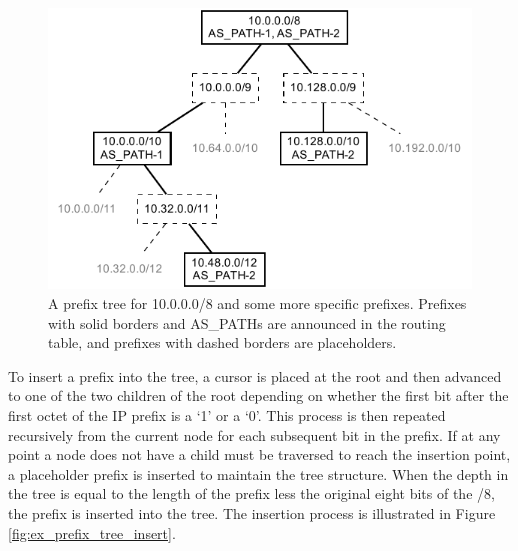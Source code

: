 \begin{figure}
\begin{center}
    \includegraphics{figures/ex_prefix_tree.pdf}
    \caption[A prefix tree]{A prefix tree for 10.0.0.0/8 and some more specific prefixes. Prefixes with solid borders and AS\_PATHs are announced in the routing table, and prefixes with dashed borders are placeholders.}
    \label{fig:ex_prefix_tree}
\end{center}
\end{figure}

To insert a prefix into the tree, a cursor is placed at the root and then advanced to one of the two children of the root depending on whether the first bit after the first octet of the IP prefix is a `1' or a `0'. This process is then repeated recursively from the current node for each subsequent bit in the prefix. If at any point a node does not have a child must be traversed to reach the insertion point, a placeholder prefix is inserted to maintain the tree structure. When the depth in the tree is equal to the length of the prefix less the original eight bits of the /8, the prefix is inserted into the tree. The insertion process is illustrated in Figure \ref{fig:ex_prefix_tree_insert}.


